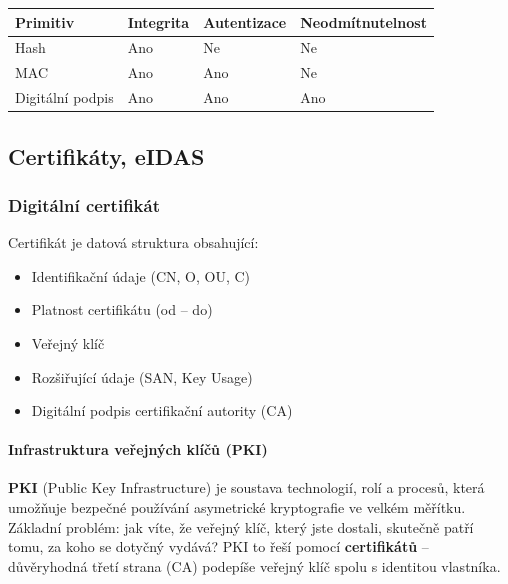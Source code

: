 \begin{center}
\begin{tabular}{llll}
\toprule
\textbf{Primitiv} & \textbf{Integrita} & \textbf{Autentizace} & \textbf{Neodmítnutelnost} \\
\midrule
Hash & Ano & Ne & Ne \\
MAC & Ano & Ano & Ne \\
Digitální podpis & Ano & Ano & Ano \\
\bottomrule
\end{tabular}
\end{center}

\subsection{Certifikáty, eIDAS}

\subsubsection{Digitální certifikát}

Certifikát je datová struktura obsahující:
\begin{itemize}
  \item Identifikační údaje (CN, O, OU, C)
  \item Platnost certifikátu (od -- do)
  \item Veřejný klíč
  \item Rozšiřující údaje (SAN, Key Usage)
  \item Digitální podpis certifikační autority (CA)
\end{itemize}

\paragraph{Infrastruktura veřejných klíčů (PKI)}

\textbf{PKI} (Public Key Infrastructure) je soustava technologií, rolí a procesů, která umožňuje bezpečné používání asymetrické kryptografie ve velkém měřítku.
Základní problém: jak víte, že veřejný klíč, který jste dostali, skutečně patří tomu, za koho se dotyčný vydává?
PKI to řeší pomocí \textbf{certifikátů} -- důvěryhodná třetí strana (CA) podepíše veřejný klíč spolu s identitou vlastníka.

